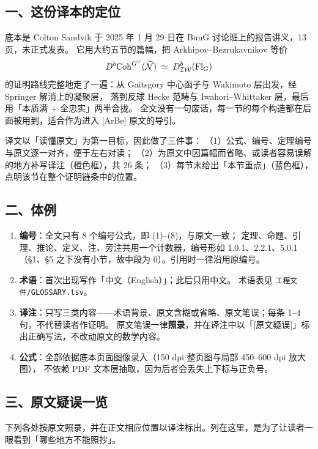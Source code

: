 \subsection*{一、这份译本的定位}

底本是 Colton Sandvik 于 2025 年 1 月 29 日在 BunG 讨论班上的报告讲义，13 页，未正式发表。
它用大约五节的篇幅，把 Arkhipov–Bezrukavnikov 等价
\[
D^b\mathrm{Coh}^{G^\vee}(\widetilde{\mathcal{N}})\;\simeq\;D^b_{\mathcal{IW}}(\mathrm{Fl}_G)
\]
的证明路线完整地走了一遍：从 Gaitsgory 中心函子与 Wakimoto 层出发，经 Springer 解消上的凝聚层，
落到反球 Hecke 范畴与 Iwahori–Whittaker 层，最后用「本质满 + 全忠实」两半合拢。
全文没有一句废话，每一节的每个构造都在后面被用到，适合作为进入 \mbox{[ArBe]} 原文的导引。

译文以「读懂原文」为第一目标，因此做了三件事：
（1）公式、编号、定理编号与原文逐一对齐，便于左右对读；
（2）为原文中因篇幅而省略、或读者容易误解的地方补写译注（橙色框），共 26 条；
（3）每节末给出「本节重点」（蓝色框），点明该节在整个证明链条中的位置。

\subsection*{二、体例}

\begin{enumerate}[leftmargin=2.2em,itemsep=2pt]
\item \textbf{编号}：全文只有 8 个编号公式，即 (1)–(8)，与原文一致；
定理、命题、引理、推论、定义、注、旁注共用一个计数器，编号形如 1.0.1、2.2.1、5.0.1
（§1、§5 之下没有小节，故中段为 0）。引用时一律沿用原编号。
\item \textbf{术语}：首次出现写作「中文（English）」；此后只用中文。
术语表见 \texttt{工程文件/GLOSSARY.tsv}。
\item \textbf{译注}：只写三类内容——术语背景、原文含糊或省略、原文笔误；每条 1–4 句，不代替读者作证明。
原文笔误一律\textbf{照录}，并在译注中以「[原文疑误]」标出正确写法，不改动原文的数学内容。
\item \textbf{公式}：全部依据底本页面图像录入（150 dpi 整页图与局部 450–600 dpi 放大图），
不依赖 PDF 文本层抽取，因为后者会丢失上下标与正负号。
\end{enumerate}

\subsection*{三、原文疑误一览}

下列各处按原文照录，并在正文相应位置以译注标出。列在这里，是为了让读者一眼看到「哪些地方不能照抄」。

